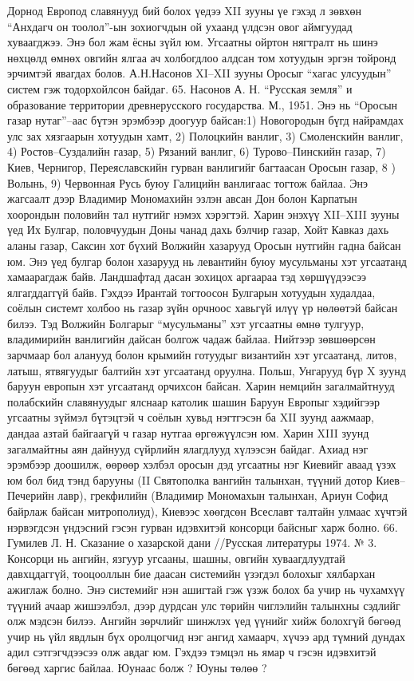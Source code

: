 Дорнод Европод славянууд бий болох үедээ XII зууны үе гэхэд л зөвхөн “Анхдагч он тоолол”-ын зохиогчдын ой ухаанд үлдсэн овог аймгуудад хуваагджээ. Энэ бол жам ёсны зүйл юм. Угсаатны ойртон нягтралт нь шинэ нөхцөлд өмнөх овгийн ялгаа ач холбогдлоо алдсан том хотуудын эргэн тойронд эрчимтэй явагдах болов. А.Н.Насонов XI–XII зууны Оросыг “хагас улсуудын” систем гэж тодорхойлсон байдаг. 65. Насонов А. Н. “Русская земля” и образование территории древнерусского государства. М., 1951.
Энэ нь “Оросын газар нутаг”–аас бүтэн эрэмбээр доогуур байсан:1) Новогородын бүгд найрамдах улс зах хязгаарын хотуудын хамт, 2) Полоцкийн ванлиг, 3) Смоленскийн ванлиг, 4) Ростов–Суздалийн газар, 5) Рязаний ванлиг, 6) Турово–Пинскийн газар, 7) Киев, Чернигор, Переяславскийн гурван ванлигийг багтаасан Оросын газар, 8 ) Волынь, 9) Червонная Русь буюу Галицийн ванлигаас тогтож байлаа. Энэ жагсаалт дээр Владимир Мономахийн эзлэн авсан Дон болон Карпатын хоорондын половийн тал нутгийг нэмэх хэрэгтэй. Харин энэхүү XII–XIII зууны үед Их Булгар, половчуудын Доны чанад дахь бэлчир газар, Хойт Кавказ дахь аланы газар, Саксин хот бүхий Волжийн хазарууд Оросын нутгийн гадна байсан юм.
Энэ үед булгар болон хазарууд нь левантийн буюу мусульманы хэт угсаатанд хамаарагдаж байв. Ландшафтад дасан зохицох аргаараа тэд хөршүүдээсээ ялгагддаггүй байв. Гэхдээ Ирантай тогтоосон Булгарын хотуудын худалдаа, соёлын системт холбоо нь газар зүйн орчноос хавьгүй илүү үр нөлөөтэй байсан билээ. Тэд Волжийн Болгарыг “мусульманы” хэт угсаатны өмнө тулгуур, владимирийн ванлигийн дайсан болгож чадаж байлаа.
Нийтээр зөвшөөрсөн зарчмаар бол аланууд болон крымийн готуудыг византийн хэт угсаатанд, литов, латыш, ятвягуудыг балтийн хэт угсаатанд оруулна. Польш, Унгарууд бүр X зуунд баруун европын хэт угсаатанд орчихсон байсан. Харин немцийн загалмайтнууд полабскийн славянуудыг ялснаар католик шашин Баруун Европыг хэдийгээр угсаатны зүймэл бүтэцтэй ч соёлын хувьд нэгтгэсэн ба XII зуунд аажмаар, дандаа азтай байгаагүй ч газар нутгаа өргөжүүлсэн юм. Харин XIII зуунд загалмайтны аян дайнууд сүйрлийн ялагдлууд хүлээсэн байдаг.
Ахиад нэг эрэмбээр доошилж, өөрөөр хэлбэл оросын дэд угсаатны нэг Киевийг аваад үзэх юм бол бид тэнд барууны (II Святополка вангийн талынхан, түүний дотор Киев–Печерийн лавр), грекфилийн (Владимир Мономахын талынхан, Ариун Софид байрлаж байсан митрополиуд), Киевээс хөөгдсөн Всеславт талтайн улмаас хүчтэй нэрвэгдсэн үндэсний гэсэн гурван идэвхитэй консорци байсныг харж болно. 66. Гумилев Л. Н. Сказание о хазарской дани //Русская литературы 1974. № 3.
Консорци нь ангийн, язгуур угсааны, шашны, овгийн хуваагдлуудтай давхцдаггүй, тооцооллын бие даасан системийн үзэгдэл болохыг хялбархан ажиглаж болно. Энэ системийг нэн ашигтай гэж үзэж болох ба учир нь чухамхүү түүний ачаар жишээлбэл, дээр дурдсан улс төрийн чиглэлийн талынхны сэдлийг олж мэдсэн билээ. Ангийн зөрчлийг шинжлэх үед үүнийг хийж болохгүй бөгөөд учир нь үйл явдлын бүх оролцогчид нэг ангид хамаарч, хүчээ ард түмний дундах адил сэтгэгчдээсээ олж авдаг юм. Гэхдээ тэмцэл нь ямар ч гэсэн идэвхитэй бөгөөд харгис байлаа. Юунаас болж ? Юуны төлөө ?
